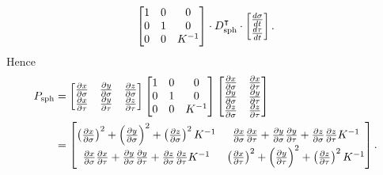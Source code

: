 \documentclass[newpage,hints,handout]{ximera}
\begin{document}
\begin{problem}
\begin{freeResponse}
\begin{align*}
    \begin{bmatrix}
      1 & 0 & 0\\
      0 & 1 & 0\\
    0 & 0 & K^{-1}
    \end{bmatrix}
    \cdot
    D_{\mathrm{sph}}^\transpose
    \cdot \begin{bmatrix}
      \frac{d\sigma}{dt} \\ \frac{d\tau}{dt}
    \end{bmatrix}.
  \end{align*}
    Hence
    \begin{align*}
      P_\mathrm{sph} &=
      \begin{bmatrix}
        \pp[x]{\sigma} & \pp[y]{\sigma} & \pp[z]{\sigma} \\
        \pp[x]{\tau} & \pp[y]{\tau} & \pp[z]{\tau}
      \end{bmatrix}
      \begin{bmatrix}
        1 & 0 & 0\\
        0 & 1 & 0\\
        0 & 0 & K^{-1}
      \end{bmatrix}
      \begin{bmatrix}
        \pp[x]{\sigma} & \pp[x]{\tau}\\ 
        \pp[y]{\sigma} & \pp[y]{\tau}\\
        \pp[z]{\sigma} & \pp[z]{\tau}
      \end{bmatrix}\\
      &=
      \begin{bmatrix}
        \left(\pp[x]{\sigma}\right)^2 + \left(\pp[y]{\sigma}\right)^2 + \left(\pp[z]{\sigma}\right)^2K^{-1} & \pp[x]{\sigma}\pp[x]{\tau} + \pp[y]{\sigma}\pp[y]{\tau} + \pp[z]{\sigma}\pp[z]{\tau} K^{-1}\\
        \pp[x]{\sigma}\pp[x]{\tau} + \pp[y]{\sigma}\pp[y]{\tau} + \pp[z]{\sigma}\pp[z]{\tau} K^{-1}       & \left(\pp[x]{\tau}\right)^2 + \left(\pp[y]{\tau}\right)^2 + \left(\pp[z]{\tau}\right)^2K^{-1}
      \end{bmatrix}.
    \end{align*}
  \end{freeResponse}
\end{problem}
\end{document}
